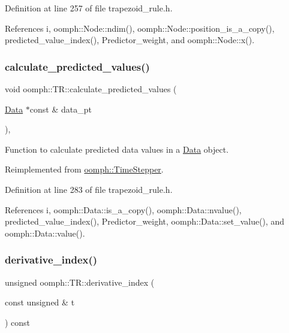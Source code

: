 Definition at line 257 of file trapezoid\+\_\+rule.\+h.



References i, oomph\+::\+Node\+::ndim(), oomph\+::\+Node\+::position\+\_\+is\+\_\+a\+\_\+copy(), predicted\+\_\+value\+\_\+index(), Predictor\+\_\+weight, and oomph\+::\+Node\+::x().

\mbox{\label{classoomph_1_1TR_a345daded718d96bb4b7d4cd2996892c8}} 
\subsubsection{\texorpdfstring{calculate\+\_\+predicted\+\_\+values()}{calculate\_predicted\_values()}}
{\footnotesize\ttfamily void oomph\+::\+T\+R\+::calculate\+\_\+predicted\+\_\+values (\begin{DoxyParamCaption}\item[{\hyperlink{classoomph_1_1Data}{Data} $\ast$const \&}]{data\+\_\+pt }\end{DoxyParamCaption})\hspace{0.3cm}{\ttfamily [inline]}, {\ttfamily [virtual]}}



Function to calculate predicted data values in a \hyperlink{classoomph_1_1Data}{Data} object. 



Reimplemented from \hyperlink{classoomph_1_1TimeStepper_a159d508b1ae643fe31b55da9ee789dbf}{oomph\+::\+Time\+Stepper}.



Definition at line 283 of file trapezoid\+\_\+rule.\+h.



References i, oomph\+::\+Data\+::is\+\_\+a\+\_\+copy(), oomph\+::\+Data\+::nvalue(), predicted\+\_\+value\+\_\+index(), Predictor\+\_\+weight, oomph\+::\+Data\+::set\+\_\+value(), and oomph\+::\+Data\+::value().

\mbox{\label{classoomph_1_1TR_abe6ad058fc43a89a8e06f671688d438e}} 
\subsubsection{\texorpdfstring{derivative\+\_\+index()}{derivative\_index()}}
{\footnotesize\ttfamily unsigned oomph\+::\+T\+R\+::derivative\+\_\+index (\begin{DoxyParamCaption}\item[{const unsigned \&}]{t }\end{DoxyParamCaption}) const\hspace{0.3cm}{\ttfamily [inline]}}



